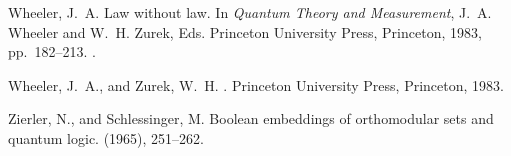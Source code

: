 \begin{thebibliography}{10}
{\sc Wheeler, J.~A.}
\newblock Law without law.
\newblock In {\em Quantum Theory and Measurement}, J.~A. Wheeler and W.~H.
  Zurek, Eds. Princeton University Press, Princeton, 1983, pp.~182--213.
\newblock \cite{wheeler-Zurek:83}.

{\sc Wheeler, J.~A., and Zurek, W.~H.}
.
\newblock Princeton University Press, Princeton, 1983.

{\sc Zierler, N., and Schlessinger, M.}
\newblock Boolean embeddings of orthomodular sets and quantum logic.
 (1965), 251--262.

\end{thebibliography}

 




